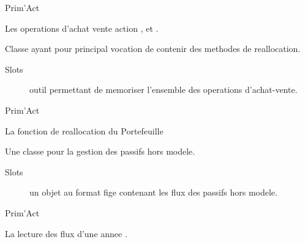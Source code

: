 \documentclass[a4paper]{book}
\begin{document}
%
\begin{Author}\relax
Prim'Act
\end{Author}
%
\begin{SeeAlso}\relax
Les operations d'achat vente action  ,
 et .
\end{SeeAlso}
%
\begin{Description}\relax
Classe ayant pour principal vocation de contenir des methodes de reallocation.
\end{Description}
%
\begin{Section}{Slots}

\begin{description}

\item[] outil permettant de memoriser l'ensemble des operations d'achat-vente.

\end{description}
\end{Section}
%
\begin{Author}\relax
Prim'Act
\end{Author}
%
\begin{SeeAlso}\relax
La fonction de reallocation du Portefeuille 
\end{SeeAlso}
%
\begin{Description}\relax
Une classe pour la gestion des passifs hors modele.
\end{Description}
%
\begin{Section}{Slots}

\begin{description}

\item[] un objet  au format fige contenant les flux des passifs hors modele.

\end{description}
\end{Section}
%
\begin{Author}\relax
Prim'Act
\end{Author}
%
\begin{SeeAlso}\relax
La lecture des flux d'une annee .
\end{SeeAlso}
\end{document}
